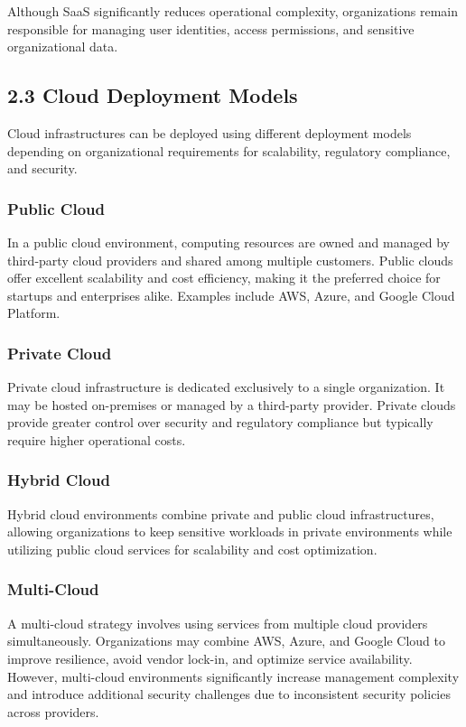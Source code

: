Although SaaS significantly reduces operational complexity, organizations remain responsible for managing user identities, access permissions, and sensitive organizational data.

\subsection{2.3 Cloud Deployment Models}

Cloud infrastructures can be deployed using different deployment models depending on organizational requirements for scalability, regulatory compliance, and security.

\subsubsection{Public Cloud}

In a public cloud environment, computing resources are owned and managed by third-party cloud providers and shared among multiple customers. Public clouds offer excellent scalability and cost efficiency, making it the preferred choice for startups and enterprises alike. Examples include AWS, Azure, and Google Cloud Platform.

\subsubsection{Private Cloud}

Private cloud infrastructure is dedicated exclusively to a single organization. It may be hosted on-premises or managed by a third-party provider. Private clouds provide greater control over security and regulatory compliance but typically require higher operational costs.

\subsubsection{Hybrid Cloud}

Hybrid cloud environments combine private and public cloud infrastructures, allowing organizations to keep sensitive workloads in private environments while utilizing public cloud services for scalability and cost optimization.

\subsubsection{Multi-Cloud}

A multi-cloud strategy involves using services from multiple cloud providers simultaneously. Organizations may combine AWS, Azure, and Google Cloud to improve resilience, avoid vendor lock-in, and optimize service availability. However, multi-cloud environments significantly increase management complexity and introduce additional security challenges due to inconsistent security policies across providers.

